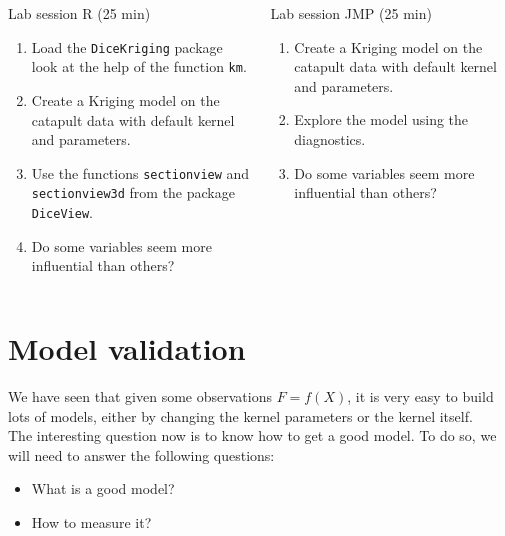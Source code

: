 \documentclass{beamer}
\begin{document}
\begin{frame}{}
\begin{columns}[t]
\column{5cm}
\begin{exampleblock}{Lab session R (25 min)}
	\begin{enumerate}
		\item Load the \texttt{DiceKriging} package look at the help of the function \texttt{km}.
		\item Create a Kriging model on the catapult data with default kernel and parameters.
		\item Use the functions \texttt{sectionview} and \texttt{sectionview3d} from the package \texttt{DiceView}.
		\item Do some variables seem more influential than others?
	\end{enumerate}
\end{exampleblock}
\column{5cm}
\begin{exampleblock}{Lab session JMP (25 min)}
	\begin{enumerate}
		\item Create a Kriging model on the catapult data with default kernel and parameters.
		\item Explore the model using the diagnostics.
		\item Do some variables seem more influential than others?
	\end{enumerate}
\end{exampleblock}
\end{columns}
\end{frame}

\section{Model validation}

\begin{frame}{}
We have seen that given some observations $F=f(X)$, it is very easy to build lots of models, either by changing the kernel parameters or the kernel itself.\\ \vspace{5mm}
The interesting question now is to know how to get a good model. To do so, we will need to answer the following questions:
\begin{itemize}
	\item What is a good model?
	\item How to measure it?
\end{itemize}
\end{frame}
\end{document}
